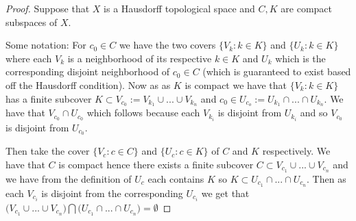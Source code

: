 \documentclass{amsart}
\theoremstyle{plain}
\theoremstyle{definition}
\theoremstyle{remark}
\begin{document}
\begin{proof}
    Suppose that $X$ is a Hausdorff topological space and $C,K$ are compact subspaces of $X$. 
    
    Some notation: For $c_0 \in C$ we have the two covers $\{V_k:k\in K\}$ and $\{U_k: k\in K\}$ where each $V_k$ is a neighborhood of its respective $k\in K$ and $U_k$ which is the corresponding disjoint neighborhood of $c_0\in C$ (which is guaranteed to exist based off the Hausdorff condition). Now as as $K$ is compact we have that $\{V_k:k\in K\}$ has a finite subcover $K\subset V_{c_0}:= V_{k_1}\cup ... \cup V_{k_n}$ and $c_0\in U_{c_o}:=U_{k_1}\cap ...\cap U_{k_n}$. We have that $V_{c_0}\cap U_{c_0}$ which follows because each $V_{k_i}$ is disjoint from $U_{k_i}$ and so $V_{c_0}$ is disjoint from $U_{c_0}$.


    Then take the cover $\{V_c: c\in C\}$ and $\{U_c: c\in K\}$ of $C$ and $K$ respectively. We have that $C$ is compact hence there exists a finite subcover $C\subset V_{c_1}\cup...\cup V_{c_n}$ and we have from the definition of $U_c$ each contains $K$ so $K\subset U_{c_1}\cap ...\cap U_{c_n}$. Then as each $V_{c_i}$ is disjoint from the corresponding $U_{c_i}$ we get that $\big (V_{c_1}\cup...\cup V_{c_n} \big )\bigcap \big (U_{c_1}\cap ...\cap U_{c_n} \big )=\emptyset$
    




    
\end{proof}



 
\end{document}
